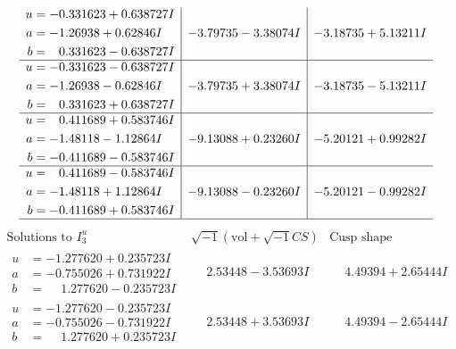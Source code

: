 \documentclass[1p]{elsarticle_modified}
\theoremstyle{definition}
\newcommand{\I}{\sqrt{-1}}
\begin{document}
$$\begin{array}{c|c|c}
\begin{aligned}
u &= -0.331623 + 0.638727 I \\
a &= -1.26938 + 0.62846 I \\
b &= \phantom{-}0.331623 - 0.638727 I\end{aligned}
 & -3.79735 - 3.38074 I & -3.18735 + 5.13211 I \\ \hline\begin{aligned}
u &= -0.331623 - 0.638727 I \\
a &= -1.26938 - 0.62846 I \\
b &= \phantom{-}0.331623 + 0.638727 I\end{aligned}
 & -3.79735 + 3.38074 I & -3.18735 - 5.13211 I \\ \hline\begin{aligned}
u &= \phantom{-}0.411689 + 0.583746 I \\
a &= -1.48118 - 1.12864 I \\
b &= -0.411689 - 0.583746 I\end{aligned}
 & -9.13088 + 0.23260 I & -5.20121 + 0.99282 I \\ \hline\begin{aligned}
u &= \phantom{-}0.411689 - 0.583746 I \\
a &= -1.48118 + 1.12864 I \\
b &= -0.411689 + 0.583746 I\end{aligned}
 & -9.13088 - 0.23260 I & -5.20121 - 0.99282 I\\
 \hline 
 \end{array}$$\newpage$$\begin{array}{c|c|c}  
\text{Solutions to }I^u_{3}& \I (\text{vol} + \sqrt{-1}CS) & \text{Cusp shape}\\
 \hline 
\begin{aligned}
u &= -1.277620 + 0.235723 I \\
a &= -0.755026 + 0.731922 I \\
b &= \phantom{-}1.277620 - 0.235723 I\end{aligned}
 & \phantom{-}2.53448 - 3.53693 I & \phantom{-}4.49394 + 2.65444 I \\ \hline\begin{aligned}
u &= -1.277620 - 0.235723 I \\
a &= -0.755026 - 0.731922 I \\
b &= \phantom{-}1.277620 + 0.235723 I\end{aligned}
 & \phantom{-}2.53448 + 3.53693 I & \phantom{-}4.49394 - 2.65444 I \\ \hline\begin{aligned}

\end{aligned}
\end{array}$$
\end{document}
